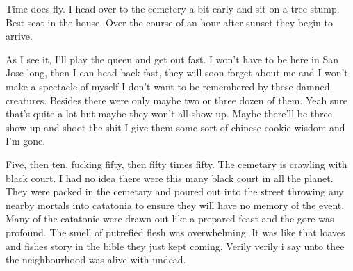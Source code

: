 Time does fly. I head over to the cemetery a bit early and sit on a tree stump. Best seat in the house. Over the course of an hour after sunset they begin to arrive. 

As I see it, I'll play the queen and get out fast. I won't have to be here in San Jose long, then I can head back fast, they will soon forget about me and I won't make a spectacle of myself I don't want to be remembered by these damned creatures. Besides there were only maybe two or three dozen of them. Yeah sure that's quite a lot but maybe they won't all show up. Maybe there'll be three show up and shoot the shit I give them some sort of chinese cookie wisdom and I'm gone.

Five, then ten, fucking fifty, then fifty times fifty. The cemetary is crawling with black court. I had no idea there were this many black court in all the planet. They were packed in the cemetary and poured out into the street throwing any nearby mortals into catatonia to ensure they will have no memory of the event. Many of the catatonic were drawn out like a prepared feast and the gore was profound. The smell of putrefied flesh was overwhelming. It was like that loaves and fishes story in the bible they just kept coming. Verily verily i say unto thee the neighbourhood was alive with undead.


